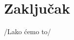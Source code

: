 \documentclass[12pt,oneside]{memoir}
\begin{document}
\chapter{Zaključak}
\literatura

\backmatter

\begin{biografija}
/Lako ćemo to/
\end{biografija}
\end{document}
